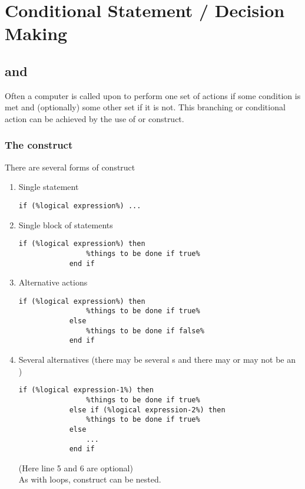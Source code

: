 \documentclass[class=book,crop=false]{standalone}
\begin{document}
\chapter{Conditional Statement / Decision Making}
    \section{ and }
    Often a computer is called upon to perform one set of actions if some condition is met and (optionally) some other set if it is not. This branching or conditional action can be achieved by the use of  or  construct.
    \subsection{The  construct}
    There are several forms of  construct
    \begin{enumerate}[label=(\roman*)]
        \item Single statement
        \begin{lstlisting}[numbers=none,escapechar=\%]
            if (%logical expression%) ...
        \end{lstlisting}
        \item Single block of statements
        \begin{lstlisting}[numbers=none,escapechar=\%]
            if (%logical expression%) then
                %things to be done if true%
            end if
        \end{lstlisting}
        \item Alternative actions
        \begin{lstlisting}[numbers=none,escapechar=\%]
            if (%logical expression%) then
                %things to be done if true%
            else
                %things to be done if false%
            end if
        \end{lstlisting}
        \item Several alternatives (there may be several s and there may or may not be an )
        \begin{lstlisting}[escapechar=\%]
            if (%logical expression-1%) then
                %things to be done if true%
            else if (%logical expression-2%) then
                %things to be done if true%
            else 
                ...
            end if
        \end{lstlisting}
        (Here line 5 and 6 are optional)\\
        As with  loops,  construct can be nested.
    \end{enumerate}
\end{document}
